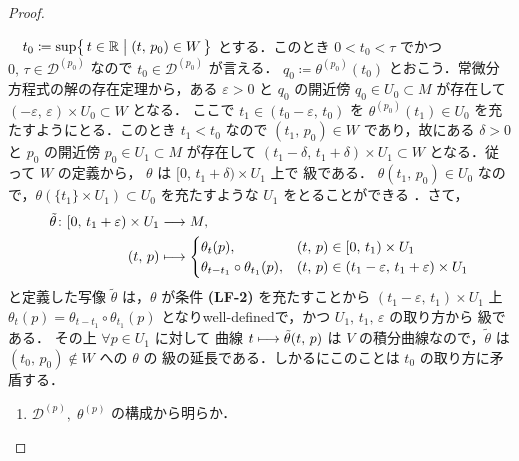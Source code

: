 \documentclass[TQFT_main]{subfiles}
\begin{document}
\begin{proof}
\begin{description}
\begin{description}
            　$t_0 \coloneqq \sup \bigl\{\, t \in \mathbb{R} \bigm| (t,\, p_0) \in W \,\bigr\}$ とする．このとき $0 < t_0 < \tau$ でかつ $0,\, \tau \in \mathcal{D}^{(p_0)}$ なので $t_0 \in \mathcal{D}^{(p_0)}$ が言える．
            $q_0 \coloneqq \theta^{(p_0)}(t_0)$ とおこう．常微分方程式の解の存在定理から，ある $\varepsilon > 0$ と $q_0$ の開近傍 $q_0 \in U_0 \subset M$ が存在して $(-\varepsilon,\, \varepsilon) \times U_0 \subset W$ となる．
            ここで $t_1 \in (t_0 -\varepsilon,\, t_0)$ を $\theta^{(p_0)}(t_1) \in U_0$ を充たすようにとる．このとき $t_1 < t_0$ なので $(t_1,\, p_0) \in W$ であり，故にある $\delta > 0$ と $p_0$ の開近傍 $p_0 \in U_1 \subset M$ が存在して $(t_1 - \delta,\, t_1 + \delta) \times U_1 \subset W$ となる．従って $W$ の定義から， $\theta$ は $[0,\, t_1 + \delta) \times U_1$ 上で \cinfty 級である．
            $\theta(t_1,\, p_0) \in U_0$ なので，$\theta(\{t_1\} \times U_1) \subset U_0$ を充たすような $U_1$ をとることができる
            ．さて，
            \begin{align}
                \tilde{\theta} \colon [0,\, t_1 + \varepsilon) \times U_1 &\longrightarrow M,\\ 
                (t,\, p) &\longmapsto
                \begin{cases}
                    \theta_t(p), &(t,\, p) \in [0,\, t_1) \times U_1 \\
                    \theta_{t-t_1}\circ \theta_{t_1}(p), &(t,\, p) \in (t_1-\varepsilon,\, t_1 + \varepsilon) \times U_1
                \end{cases}
            \end{align}
            と定義した写像 $\tilde{\theta}$ は，$\theta$ が条件 \textbf{\textsf{(LF-2)}} を充たすことから $(t_1 - \varepsilon,\, t_1) \times U_1$ 上 $\theta_t (p) = \theta_{t-t_1}\circ \theta_{t_1}(p)$ となりwell-definedで，かつ $U_1,\, t_1,\, \varepsilon$ の取り方から \cinfty 級である．
            その上 $\forall p \in U_1$ に対して \cinfty 曲線 $t \longmapsto \tilde{\theta}(t,\, p)$ は $V$ の積分曲線なので，$\tilde{\theta}$ は $(t_0,\, p_0) \notin W$ への $\theta$ の \cinfty 級の延長である．しかるにこのことは $t_0$ の取り方に矛盾する．
        \end{description}
    \end{description}
    \begin{enumerate}
        \item $\mathcal{D}^{(p)},\; \theta^{(p)}$ の構成から明らか．

\end{enumerate}
\end{proof}
\end{document}
